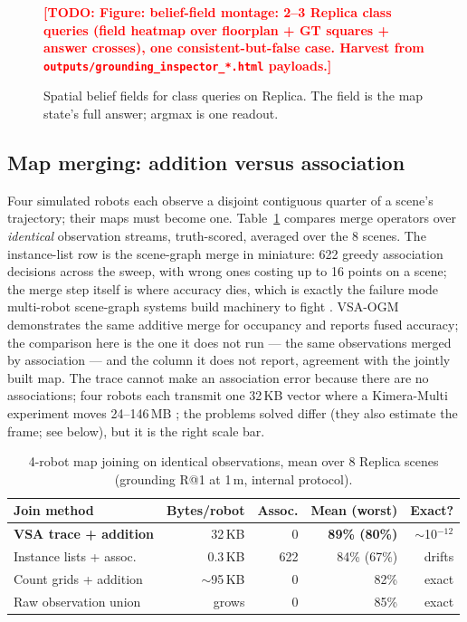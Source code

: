 \documentclass[conference]{IEEEtran}
\newcommand{\todo}[1]{\textcolor{red}{\textbf{[TODO: #1]}}}
\begin{document}
\begin{figure}[t]
\centering
\todo{Figure: belief-field montage: 2--3 Replica class queries
(field heatmap over floorplan + GT squares + answer crosses), one
consistent-but-false case. Harvest from
\texttt{outputs/grounding\_inspector\_*.html} payloads.}
\caption{Spatial belief fields for class queries on Replica. The field is
the map state's full answer; argmax is one readout.}
\label{fig:fields}
\end{figure}

\subsection{Map merging: addition versus association}
\label{sec:merge-results}

Four simulated robots each observe a disjoint contiguous quarter of a
scene's trajectory; their maps must become one. Table~\ref{tab:merge}
compares merge operators over \emph{identical} observation streams,
truth-scored, averaged over the 8 scenes.
The instance-list row is the scene-graph merge in miniature: 622 greedy
association decisions across the sweep, with wrong ones costing up to 16
points on a scene; the merge step itself is where accuracy dies, which
is exactly the failure mode multi-robot scene-graph systems build
machinery to fight \cite{chang2023hydramulti}. VSA-OGM
\cite{snyder2026vsaogm} demonstrates the same additive merge for
occupancy and reports fused accuracy; the comparison here is the one it
does not run --- the same observations merged by association --- and the
column it does not report, agreement with the jointly built map. The
trace cannot make an
association error because there are no associations; four robots each
transmit one 32\,KB vector where a Kimera-Multi experiment moves
24--146\,MB \cite{tian2022kimeramulti}; the problems solved differ
(they also estimate the frame; see below), but it is the right scale
bar.

\begin{table}[t]
\caption{4-robot map joining on identical observations, mean over 8
Replica scenes (grounding R@1 at 1\,m, internal protocol).}
\label{tab:merge}
\centering
\small
\begin{tabular}{@{}lrrrr@{}}
\toprule
Join method & Bytes/robot & Assoc. & Mean (worst) & Exact? \\
\midrule
\textbf{VSA trace + addition} & 32\,KB & 0 & \textbf{89\% (80\%)} & $\sim$10$^{-12}$ \\
Instance lists + assoc. & 0.3\,KB & 622 & 84\% (67\%) & drifts \\
Count grids + addition & $\sim$95\,KB & 0 & 82\% & exact \\
Raw observation union & grows & 0 & 85\% & exact \\
\bottomrule
\end{tabular}
\end{table}
\end{document}
